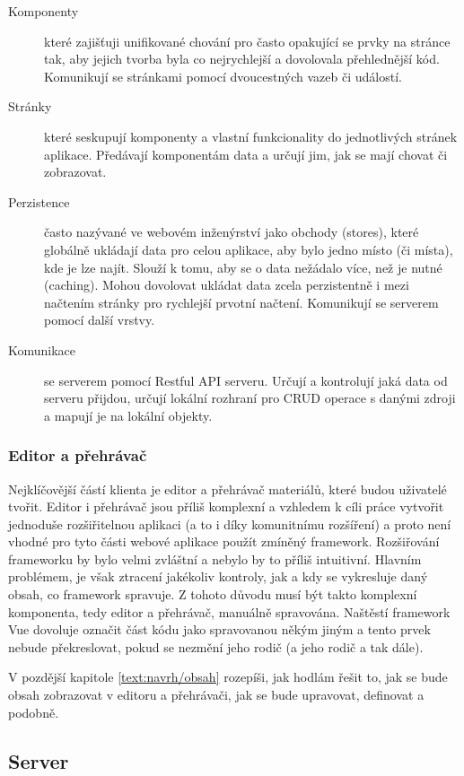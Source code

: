 \begin{description}
    \item[Komponenty] které zajišťuji unifikované chování pro často opakující se prvky na stránce tak, aby jejich tvorba byla co nejrychlejší a dovolovala přehlednější kód. Komunikují se stránkami pomocí dvoucestných vazeb či událostí.
    \item[Stránky] které seskupují komponenty a vlastní funkcionality do jednotlivých stránek aplikace. Předávají komponentám data a určují jim, jak se mají chovat či zobrazovat.
    \item[Perzistence] často nazývané ve webovém inženýrství jako obchody (stores), které globálně ukládají data pro celou aplikace, aby bylo jedno místo (či místa), kde je lze najít. Slouží k tomu, aby se o data nežádalo více, než je nutné (caching). Mohou dovolovat ukládat data zcela perzistentně i mezi načtením stránky pro rychlejší prvotní načtení. Komunikují se serverem pomocí další vrstvy.
    \item[Komunikace] se serverem pomocí Restful API serveru. Určují a kontrolují jaká data od serveru přijdou, určují lokální rozhraní pro CRUD operace s danými zdroji a mapují je na lokální objekty.
\end{description}

\subsubsection{Editor a přehrávač}

Nejklíčovější částí klienta je editor a přehrávač materiálů, které budou uživatelé tvořit.
Editor i přehrávač jsou příliš komplexní a vzhledem k cíli práce vytvořit jednoduše rozšiřitelnou aplikaci (a to i díky komunitnímu rozšíření) a proto není vhodné pro tyto části webové aplikace použít zmíněný framework.
Rozšiřování frameworku by bylo velmi zvláštní a nebylo by to příliš intuitivní.
Hlavním problémem, je však ztracení jakékoliv kontroly, jak a kdy se vykresluje daný obsah, co framework spravuje.
Z tohoto důvodu musí být takto komplexní komponenta, tedy editor a přehrávač, manuálně spravována.
Naštěstí framework Vue dovoluje označit část kódu jako spravovanou někým jiným a tento prvek nebude překreslovat, pokud se nezmění jeho rodič (a jeho rodič a tak dále). 

V pozdější kapitole \ref{text:navrh/obsah} rozepíši, jak hodlám řešit to, jak se bude obsah zobrazovat v editoru a přehrávači, jak se bude upravovat, definovat a podobně.

\subsection{Server}

